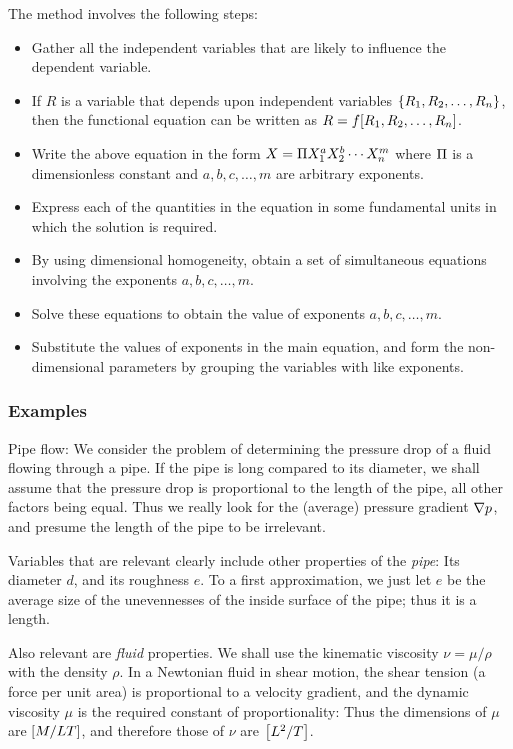 The method involves the following steps:
\begin{itemize}
%
\item Gather all the independent variables that are likely to influence the dependent variable.
%
\item If $R$ is a variable that depends upon independent variables $\left\lbrace{R_1, R_2, \dotsc, R_n}\right\rbrace$, then the functional equation can be written as $R = f\!\left[{R_1, R_2, \dotsc, R_n}\right]$.
%
\item Write the above equation in the form $X = \Pi X_1^a X_2^b \dotsb X_n^m$ where $\Pi$ is a dimensionless constant and $a, b, c, \dotsc, m$ are arbitrary exponents.
%
\item Express each of the quantities in the equation in some fundamental units in which the solution is required.
%
\item By using dimensional homogeneity, obtain a set of simultaneous equations involving the exponents $a, b, c, \dotsc, m$.
%
\item Solve these equations to obtain the value of exponents $a, b, c, \dotsc, m$.
%
\item Substitute the values of exponents in the main equation, and form the non-dimensional parameters by grouping the variables with like exponents.
%
\end{itemize}


\subsubsection{Examples}
Pipe flow: We consider the problem of determining the pressure drop of a fluid flowing through a pipe. If the pipe is long compared to its diameter, we shall assume that the pressure drop is proportional to the length of the pipe, all other factors being equal. Thus we really look for the (average) pressure gradient $\nabla p$, and presume the length of the pipe to be irrelevant.

Variables that are relevant clearly include other properties of the \emph{pipe}: Its diameter $d$, and its roughness $e$. To a first approximation, we just let $e$ be the average size of the unevennesses of the inside surface of the pipe; thus it is a length.

Also relevant are \emph{fluid} properties. We shall use the kinematic viscosity $\nu = \mu/\rho$ with the density $\rho$. In a Newtonian fluid in shear motion, the shear tension (a force per unit area) is proportional to a velocity gradient, and the dynamic viscosity $\mu$ is the required constant of proportionality: Thus the dimensions of $\mu$ are $\left[{M/LT}\right]$, and therefore those of $\nu$ are $\left[{L^2/T}\right]$. 

